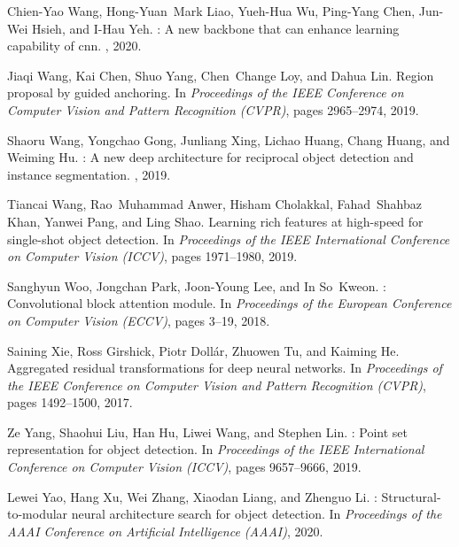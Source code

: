 \documentclass[10pt,twocolumn,letterpaper]{article}
\begin{document}
{\begin{thebibliography}{100}
	Chien-Yao Wang, Hong-Yuan~Mark Liao, Yueh-Hua Wu, Ping-Yang Chen, Jun-Wei
	Hsieh, and I-Hau Yeh.
	: A new backbone that can enhance learning capability of cnn.
	, 2020.
	
	Jiaqi Wang, Kai Chen, Shuo Yang, Chen~Change Loy, and Dahua Lin.
	\newblock Region proposal by guided anchoring.
	\newblock In {\em Proceedings of the IEEE Conference on Computer Vision and
		Pattern Recognition (CVPR)}, pages 2965--2974, 2019.
	
	Shaoru Wang, Yongchao Gong, Junliang Xing, Lichao Huang, Chang Huang, and
	Weiming Hu.
	: A new deep architecture for reciprocal object detection and
	instance segmentation.
	, 2019.
	
	Tiancai Wang, Rao~Muhammad Anwer, Hisham Cholakkal, Fahad~Shahbaz Khan, Yanwei
	Pang, and Ling Shao.
	\newblock Learning rich features at high-speed for single-shot object
	detection.
	\newblock In {\em Proceedings of the IEEE International Conference on Computer
		Vision (ICCV)}, pages 1971--1980, 2019.
	
	Sanghyun Woo, Jongchan Park, Joon-Young Lee, and In So~Kweon.
	: Convolutional block attention module.
	\newblock In {\em Proceedings of the European Conference on Computer Vision
		(ECCV)}, pages 3--19, 2018.
	
	Saining Xie, Ross Girshick, Piotr Doll{\'a}r, Zhuowen Tu, and Kaiming He.
	\newblock Aggregated residual transformations for deep neural networks.
	\newblock In {\em Proceedings of the IEEE Conference on Computer Vision and
		Pattern Recognition (CVPR)}, pages 1492--1500, 2017.
	
	Ze Yang, Shaohui Liu, Han Hu, Liwei Wang, and Stephen Lin.
	: Point set representation for object detection.
	\newblock In {\em Proceedings of the IEEE International Conference on Computer
		Vision (ICCV)}, pages 9657--9666, 2019.
	
	Lewei Yao, Hang Xu, Wei Zhang, Xiaodan Liang, and Zhenguo Li.
	: Structural-to-modular neural architecture search for object
	detection.
	\newblock In {\em Proceedings of the AAAI Conference on Artificial Intelligence
		(AAAI)}, 2020.
	

\end{thebibliography}}
\end{document}
